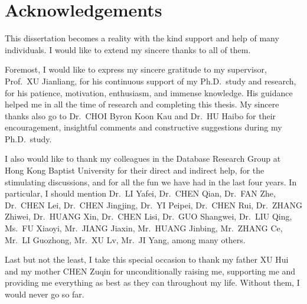 \chapter{Acknowledgements}

This dissertation becomes a reality with the kind support and help of many individuals. I would like to extend my sincere thanks to all of them.

Foremost, I would like to express my sincere gratitude to my supervisor, Prof.~XU Jianliang, for his continuous support of my Ph.D.\ study and research, for his patience, motivation, enthusiasm, and immense knowledge. His guidance helped me in all the time of research and completing this thesis. My sincere thanks also go to Dr.~CHOI Byron Koon Kau and Dr.~HU Haibo for their encouragement, insightful comments and constructive suggestions during my Ph.D.\ study.

I also would like to thank my colleagues in the Database Research Group at Hong Kong Baptist University for their direct and indirect help, for the stimulating discussions, and for all the fun we have had in the last four years. In particular, I should mention Dr.~LI Yafei, Dr.~CHEN Qian, Dr.~FAN Zhe, Dr.~CHEN Lei, Dr.~CHEN Jingjing, Dr.~YI Peipei, Dr.~CHEN Rui, Dr.~ZHANG Zhiwei, Dr.~HUANG Xin, Dr.~CHEN Lisi, Dr.~GUO Shangwei, Dr.~LIU Qing, Ms.~FU Xiaoyi, Mr.~JIANG Jiaxin, Mr.~HUANG Jinbing, Mr.~ZHANG Ce, Mr.~LI Guozhong, Mr.~XU Lv, Mr.~JI Yang, among many others.

Last but not the least, I take this special occasion to thank my father XU Hui and my mother CHEN Zuqin for unconditionally raising me, supporting me and providing me everything as best as they can throughout my life. Without them, I would never go so far.
